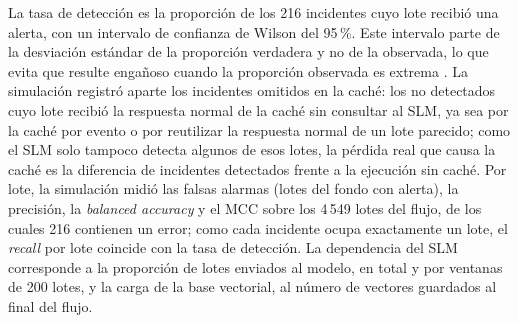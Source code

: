 La tasa de detección es la proporción de los 216 incidentes cuyo lote recibió una alerta, con un intervalo de confianza de Wilson del 95\,\%. Este intervalo parte de la desviación estándar de la proporción verdadera y no de la observada, lo que evita que resulte engañoso cuando la proporción observada es extrema \cite{wilson1927_probable}. La simulación registró aparte los incidentes omitidos en la caché: los no detectados cuyo lote recibió la respuesta normal de la caché sin consultar al SLM, ya sea por la caché por evento o por reutilizar la respuesta normal de un lote parecido; como el SLM solo tampoco detecta algunos de esos lotes, la pérdida real que causa la caché es la diferencia de incidentes detectados frente a la ejecución sin caché. Por lote, la simulación midió las falsas alarmas (lotes del fondo con alerta), la precisión, la \textit{balanced accuracy} y el MCC sobre los 4\,549 lotes del flujo, de los cuales 216 contienen un error; como cada incidente ocupa exactamente un lote, el \textit{recall} por lote coincide con la tasa de detección. La dependencia del SLM corresponde a la proporción de lotes enviados al modelo, en total y por ventanas de 200 lotes, y la carga de la base vectorial, al número de vectores guardados al final del flujo.
